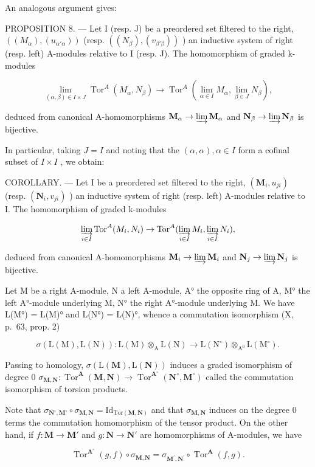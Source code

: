 An analogous argument gives:

PROPOSITION 8. --- Let I (resp. J) be a preordered set filtered to the right, \(((M_{\alpha}), (u_{\alpha' \alpha}))\) (resp. \(((N_{\beta}), (v_{\beta' \beta}))\) ) an inductive system of right (resp. left) A-modules relative to I (resp. J). The homomorphism of graded k-modules

\[
\lim _ {(\alpha , \beta) \in I \times J} \operatorname{Tor} ^ {A} \left(M _ {\alpha}, N _ {\beta}\right)\rightarrow \operatorname{Tor} ^ {A} \left(\lim _ {\alpha \in I} M _ {\alpha}, \lim _ {\beta \in J} N _ {\beta}\right),
\]

deduced from canonical A-homomorphisms \(\mathbf{M}_{\alpha} \to \varinjlim \mathbf{M}_{\alpha}\) and \(\mathbf{N}_{\beta} \to \varinjlim \mathbf{N}_{\beta}\) is bijective.

In particular, taking \(J = I\) and noting that the \((\alpha, \alpha), \alpha \in I\) form a cofinal subset of \(I \times I\) , we obtain:

COROLLARY. --- Let I be a preordered set filtered to the right, \((\mathbf{M}_{i}, u_{ji})\) (resp. \((\mathbf{N}_{i}, v_{ji})\) ) an inductive system of right (resp. left) A-modules relative to I. The homomorphism of graded k-modules

\[
\varinjlim_ {i \in I} \operatorname{Tor} ^ {A} (M _ {i}, N _ {i}) \rightarrow \operatorname{Tor} ^ {A} (\varinjlim_ {i \in I} M _ {i}, \varinjlim_ {i \in I} N _ {i}),
\]

deduced from canonical A-homomorphisms \(\mathbf{M}_i\to \varinjlim \mathbf{M}_i\) and \(\mathbf{N}_j\to \varinjlim \mathbf{N}_j\) is bijective.

Let M be a right A-module, N a left A-module, A° the opposite ring of A, M° the left A°-module underlying M, N° the right A°-module underlying M. We have L(M°) = L(M)° and L(N°) = L(N)°, whence a commutation isomorphism (X, p.~63, prop. 2)

\[
\sigma (\mathrm{L} (\mathrm{M}), \mathrm{L} (\mathrm{N})): \mathrm{L} (\mathrm{M}) \otimes_ {\mathrm{A}} \mathrm{L} (\mathrm{N}) \rightarrow \mathrm{L} (\mathrm{N} ^ {\circ}) \otimes_ {\mathrm{A} ^ {0}} \mathrm{L} (\mathrm{M} ^ {\circ}).
\]

Passing to homology, \(\sigma(\mathrm{L}(\mathbf{M}),\mathrm{L}(\mathbf{N}))\) induces a graded isomorphism of degree 0 \(\sigma_{\mathbf{M},\mathbf{N}}:\operatorname{Tor}^{\mathbf{A}}(\mathbf{M},\mathbf{N})\to\operatorname{Tor}^{\mathbf{A}^{\circ}}(\mathbf{N}^{\circ},\mathbf{M}^{\circ})\) called the commutation isomorphism of torsion products.

Note that \(\sigma_{\mathbf{N}^{\circ},\mathbf{M}^{\circ}}\circ\sigma_{\mathbf{M},\mathbf{N}}=\mathrm{Id}_{\mathrm{Tor}\left(\mathbf{M},\mathbf{N}\right)}\) and that \(\sigma_{\mathbf{M},\mathbf{N}}\) induces on the degree 0 terms the commutation homomorphism of the tensor product. On the other hand, if \(f:\mathbf{M}\to\mathbf{M}'\) and \(g:\mathbf{N}\to\mathbf{N}'\) are homomorphisms of A-modules, we have

\[
\operatorname{Tor} ^ {\mathbf {A} ^ {\circ}} (g, f) \circ \sigma_ {\mathbf {M}, \mathbf {N}} = \sigma_ {\mathbf {M} ^ {\prime}, \mathbf {N} ^ {\prime}} \circ \operatorname{Tor} ^ {\mathbf {A}} (f, g).
\]

